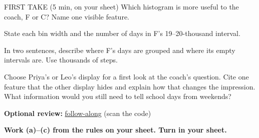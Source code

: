 \documentclass[14pt]{extarticle}
\begin{document}
\begin{firsttakebox}{FIRST TAKE (5 min, on your sheet)}
Which histogram is more useful to the coach, F or C? Name one visible feature.
\end{firsttakebox}

\begin{description}[leftmargin=1.15in, labelwidth=1in, itemsep=2pt, topsep=2pt]
  \item[\dokbadge{1}~(a)] State each bin width and the number of days in F's 19--20-thousand interval.
  \item[\dokbadge{2}~(b)] In two sentences, describe where F's days are grouped and where its empty intervals are. Use thousands of steps.
  \item[\dokbadge{3}~(c)] Choose Priya's or Leo's display for a first look at the coach's question. Cite one feature that the other display hides and explain how that changes the impression. What information would you still need to tell school days from weekends?
\end{description}

\vfill
\noindent\begin{minipage}{0.84\linewidth}
\textbf{Optional review:} \href{https://robjohncolson.github.io/apstats-live-worksheet/u1_lesson5_live.html}{follow-along} (scan the code)\par
\textbf{Work (a)--(c) from the rules on your sheet. Turn in your sheet.}
\end{minipage}\hfill
{}
\end{document}
